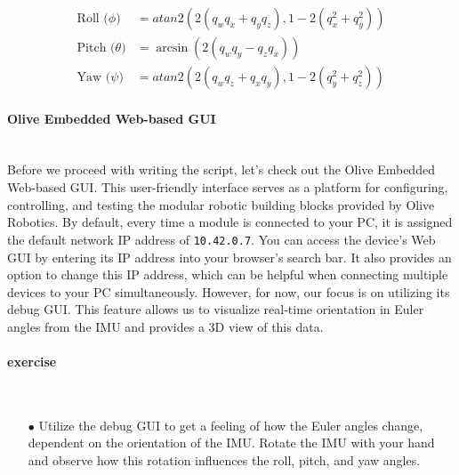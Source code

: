 \documentclass{article}
\begin{document}
\begin{equation}
\begin{aligned}
\text{Roll (}\phi\text{)} &= atan2(2(q_w q_x + q_y q_z), 1 - 2(q_x^2 + q_y^2)) \\
\text{Pitch (}\theta\text{)} &= \arcsin(2(q_w q_y - q_z q_x)) \\
\text{Yaw (}\psi\text{)} &= atan2(2(q_w q_z + q_x q_y), 1 - 2(q_y^2 + q_z^2))
\end{aligned}
\end{equation}


\paragraph{Olive Embedded Web-based GUI}~\\
Before we proceed with writing the script, let's check out the Olive Embedded Web-based GUI. This user-friendly interface serves as a platform for configuring, controlling, and testing the modular robotic building blocks provided by Olive Robotics. By default, every time a module is connected to your PC, it is assigned the default network IP address of \texttt{10.42.0.7}. You can access the device's Web GUI by entering its IP address into your browser's search bar. It also provides an option to change this IP address, which can be helpful when connecting multiple devices to your PC simultaneously. However, for now, our focus is on utilizing its debug GUI. This feature allows us to visualize real-time orientation in Euler angles from the IMU and provides a 3D view of this data.

\paragraph{exercise}~\\
\begin{enumerate}
    \item[$\bullet$] Utilize the debug GUI to get a feeling of how the Euler angles change, dependent on the orientation of the IMU. Rotate the IMU with your hand and observe how this rotation influences the roll, pitch, and yaw angles.
\end{enumerate}
\end{document}
